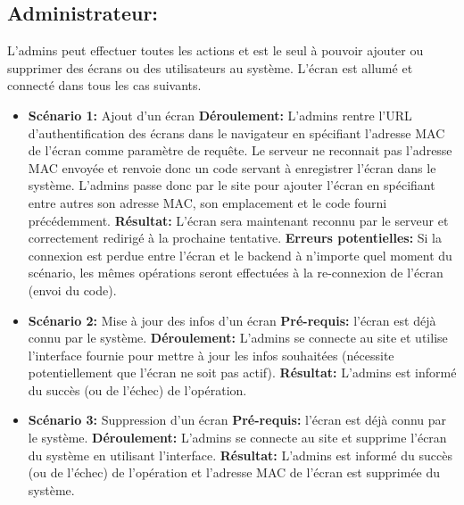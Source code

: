\documentclass[french]{article}
\begin{document}
\begin{appendices}
	\subsection{Administrateur:}
	L'admins peut effectuer toutes les actions et est le seul à pouvoir ajouter ou supprimer des écrans ou des utilisateurs au système. L'écran est allumé et connecté dans tous les cas suivants. \newline
		\begin{itemize}
		\item \textbf{Scénario 1:} Ajout d'un écran\newline
		\textbf{Déroulement:} L'admins rentre l'URL d'authentification des écrans dans le navigateur en spécifiant l'adresse MAC de l'écran comme paramètre de requête. Le serveur ne reconnait pas l'adresse MAC envoyée et renvoie donc un code servant à enregistrer l'écran dans le système. L'admins passe donc par le site pour ajouter l'écran en spécifiant entre autres son adresse MAC, son emplacement et le code fourni précédemment.\newline
		\textbf{Résultat:} L'écran sera maintenant reconnu par le serveur et correctement redirigé à la prochaine tentative.\newline
		\textbf{Erreurs potentielles:} Si la connexion est perdue entre l'écran et le backend à n'importe quel moment du scénario, les mêmes opérations seront effectuées à la re-connexion de l'écran (envoi du code). \newline
		
		\item \textbf{Scénario 2:} Mise à jour des infos d'un écran\newline
		\textbf{Pré-requis:} l'écran est déjà connu par le système.\newline
		\textbf{Déroulement:} L'admins se connecte au site et utilise l'interface fournie pour mettre à jour les infos souhaitées (nécessite potentiellement que l'écran ne soit pas actif).\newline
		\textbf{Résultat:} L'admins est informé du succès (ou de l'échec) de l'opération.\newline
		
		\item \textbf{Scénario 3:} Suppression d'un écran\newline
		\textbf{Pré-requis:} l'écran est déjà connu par le système.\newline
		\textbf{Déroulement:} L'admins se connecte au site et supprime l'écran du système en utilisant l'interface.\newline
		\textbf{Résultat:} L'admins est informé du succès (ou de l'échec) de l'opération et l'adresse MAC de l'écran est supprimée du système.\newline


\end{itemize}
\end{appendices}
\end{document}
